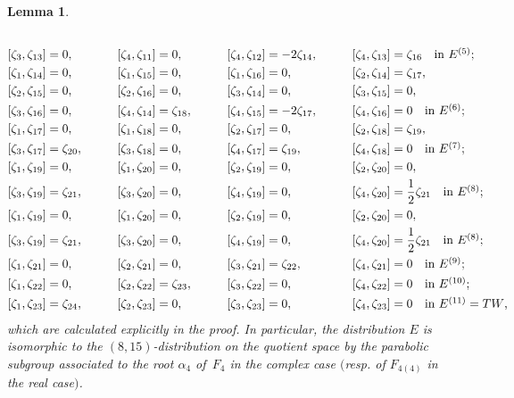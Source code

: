 \documentclass[11pt]{article}
\numberwithin{equation}{section}
\numberwithin{equation}{section}
\newtheorem{Lemma}[Theorem]{Lemma}
\theoremstyle{definition}
\newcommand{\0}{\boldsymbol{0}}
\begin{document}
\begin{Lemma}
\begin{alignat*}{8}
\\
&[\zeta_3, \zeta_{13}] = 0,\qquad&& [\zeta_4, \zeta_{11}] = 0,\qquad&&
[\zeta_4, \zeta_{12}] = -2 \zeta_{14},\qquad&& [\zeta_4, \zeta_{13}] = \zeta_{16} \quad \makebox[0pt][l]{\text{in $E^{(5)}$;}}&
\\
&[\zeta_1, \zeta_{14}] = 0,\qquad&& [\zeta_1, \zeta_{15}] = 0,\qquad&& [\zeta_1, \zeta_{16}] = 0,\qquad&& [\zeta_2, \zeta_{14}] = \zeta_{17},&\\
& [\zeta_2, \zeta_{15}] = 0,\qquad&& [\zeta_2, \zeta_{16}] = 0,\qquad&& [\zeta_3, \zeta_{14}] = 0,\qquad&&[\zeta_3, \zeta_{15}] = 0,&
 \\
&[\zeta_3, \zeta_{16}] = 0,\qquad&& [\zeta_4, \zeta_{14}] = \zeta_{18},\qquad&& [\zeta_4, \zeta_{15}] = -2\zeta_{17},\qquad&&
[\zeta_4, \zeta_{16}] = 0 \quad \makebox[0pt][l]{\text{in $E^{(6)}$;}}&
\\
&[\zeta_1, \zeta_{17}] = 0,\qquad&& [\zeta_1, \zeta_{18}] = 0,\qquad&& [\zeta_2, \zeta_{17}] = 0,\qquad&& [\zeta_2, \zeta_{18}] = \zeta_{19},&\\
&[\zeta_3, \zeta_{17}] = \zeta_{20},\qquad&& [\zeta_3, \zeta_{18}] = 0,\qquad&& [\zeta_4, \zeta_{17}] = \zeta_{19},\qquad&&
 [\zeta_4, \zeta_{18}] = 0 \quad \makebox[0pt][l]{\text{in $E^{(7)}$;}}&
 \\
&[\zeta_1, \zeta_{19}] = 0,\qquad&& [\zeta_1, \zeta_{20}] = 0,\qquad&& [\zeta_2, \zeta_{19}] = 0,\qquad&& [\zeta_2, \zeta_{20}] = 0,&\\
&[\zeta_3, \zeta_{19}] = \zeta_{21},\qquad&& [\zeta_3, \zeta_{20}] = 0,\qquad&&[\zeta_4, \zeta_{19}] = 0,\qquad&&
 [\zeta_4, \zeta_{20}] = \frac{1}{2}\zeta_{21} \quad \makebox[0pt][l]{\text{in $E^{(8)}$;}}&
 \\
&[\zeta_1, \zeta_{19}] = 0,\qquad&& [\zeta_1, \zeta_{20}] = 0,\qquad&& [\zeta_2, \zeta_{19}] = 0,\qquad&& [\zeta_2, \zeta_{20}] = 0,&
 \\
& [\zeta_3, \zeta_{19}] = \zeta_{21},\qquad&& [\zeta_3, \zeta_{20}] = 0,\qquad&&[\zeta_4, \zeta_{19}] = 0,\qquad&&
 [\zeta_4, \zeta_{20}] = \frac{1}{2}\zeta_{21} \quad \makebox[0pt][l]{\text{in $E^{(8)}$;}}&
 \\
&[\zeta_1, \zeta_{21}] = 0,\qquad&& [\zeta_2, \zeta_{21}] = 0,\qquad&& [\zeta_3, \zeta_{21}] = \zeta_{22},\qquad&& [\zeta_4, \zeta_{21}] = 0
 \quad \makebox[0pt][l]{\text{in $E^{(9)}$;}}&
 \\
&[\zeta_1, \zeta_{22}] = 0,\qquad&& [\zeta_2, \zeta_{22}] = \zeta_{23},\qquad&& [\zeta_3, \zeta_{22}] = 0,\qquad&& [\zeta_4, \zeta_{22}] = 0
\quad \makebox[0pt][l]{\text{in $E^{(10)}$;}}&
 \\
&[\zeta_1, \zeta_{23}] = \zeta_{24},\qquad&& [\zeta_2, \zeta_{23}] = 0,\qquad&& [\zeta_3, \zeta_{23}] = 0,\qquad&& [\zeta_4, \zeta_{23}] = 0
 \quad \makebox[0pt][l]{\text{in $E^{(11)} = TW$,}}&
\end{alignat*}
which are calculated explicitly in the proof.
In particular, the distribution $E$ is isomorphic to the $(8, 15)$-distribution on
the quotient space by the parabolic subgroup associated to the root $\alpha_4$ of~$F_4$ in the complex case $($resp.
of $F_{4(4)}$ in the real case$)$.
\end{Lemma}
\end{document}
